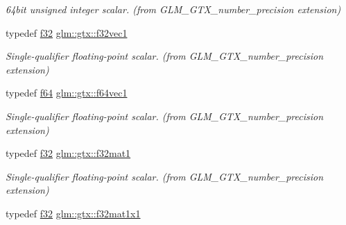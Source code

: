 \begin{DoxyCompactItemize}
\begin{DoxyCompactList}\small\item\em 64bit unsigned integer scalar. (from G\+L\+M\+\_\+\+G\+T\+X\+\_\+number\+\_\+precision extension) \end{DoxyCompactList}\item 
\mbox{\label{group__gtx__number__precision_gadab8e598b0b4697629482682bdb7f223}} 
typedef \hyperlink{group__gtc__type__precision_ga0ec999b57f5330d9021256e96038df04}{f32} \hyperlink{group__gtx__number__precision_gadab8e598b0b4697629482682bdb7f223}{glm\+::gtx\+::f32vec1}
\begin{DoxyCompactList}\small\item\em Single-\/qualifier floating-\/point scalar. (from G\+L\+M\+\_\+\+G\+T\+X\+\_\+number\+\_\+precision extension) \end{DoxyCompactList}\item 
\mbox{\label{group__gtx__number__precision_ga44336a26c958d66efdfb5a6c114c538e}} 
typedef \hyperlink{group__gtc__type__precision_ga2bba392e555124b36cde6abba349bab3}{f64} \hyperlink{group__gtx__number__precision_ga44336a26c958d66efdfb5a6c114c538e}{glm\+::gtx\+::f64vec1}
\begin{DoxyCompactList}\small\item\em Single-\/qualifier floating-\/point scalar. (from G\+L\+M\+\_\+\+G\+T\+X\+\_\+number\+\_\+precision extension) \end{DoxyCompactList}\item 
\mbox{\label{group__gtx__number__precision_gae5ff376ec910c360f06acc0c2b99260c}} 
typedef \hyperlink{group__gtc__type__precision_ga0ec999b57f5330d9021256e96038df04}{f32} \hyperlink{group__gtx__number__precision_gae5ff376ec910c360f06acc0c2b99260c}{glm\+::gtx\+::f32mat1}
\begin{DoxyCompactList}\small\item\em Single-\/qualifier floating-\/point scalar. (from G\+L\+M\+\_\+\+G\+T\+X\+\_\+number\+\_\+precision extension) \end{DoxyCompactList}\item 
\mbox{\label{group__gtx__number__precision_ga01caec78388a82a9a22bd45e5751a38a}} 
typedef \hyperlink{group__gtc__type__precision_ga0ec999b57f5330d9021256e96038df04}{f32} \hyperlink{group__gtx__number__precision_ga01caec78388a82a9a22bd45e5751a38a}{glm\+::gtx\+::f32mat1x1}

\end{DoxyCompactItemize}
